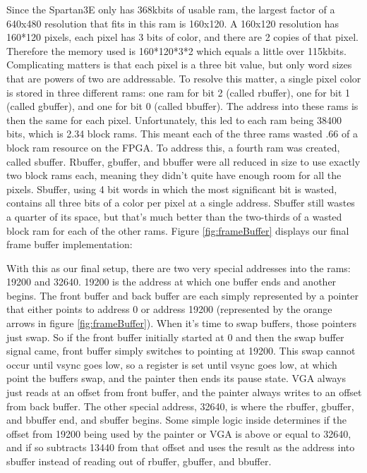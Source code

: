 \documentclass[onecolumn]{IEEEtran}
\begin{document}
Since the Spartan3E only has 368kbits of usable ram, the largest factor of a 640x480 resolution that fits in this ram is 160x120.  A 160x120 resolution has 160*120 pixels, each pixel has 3 bits of color, and there are 2 copies of that pixel.  Therefore the memory used is 160*120*3*2 which equals a little over 115kbits.  Complicating matters is that each pixel is a three bit value, but only word sizes that are powers of two are addressable.  To resolve this matter, a single pixel color is stored in three different rams: one ram for bit 2 (called rbuffer), one for bit 1 (called gbuffer), and one for bit 0 (called bbuffer).  The address into these rams is then the same for each pixel.  Unfortunately, this led to each ram being 38400 bits, which is 2.34 block rams.  This meant each of the three rams wasted .66 of a block ram resource on the FPGA.  To address this, a fourth ram was created, called sbuffer.  Rbuffer, gbuffer, and bbuffer were all reduced in size to use exactly two block rams each, meaning they didn’t quite have enough room for all the pixels.  Sbuffer, using 4 bit words in which the most significant bit is wasted, contains all three bits of a color per pixel at a single address.  Sbuffer still wastes a quarter of its space, but that’s much better than the two-thirds of a wasted block ram for each of the other rams.  Figure \ref{fig:frameBuffer} displays our final frame buffer implementation:


With this as our final setup, there are two very special addresses into the rams: 19200 and 32640.  19200 is the address at which one buffer ends and another begins.  The front buffer and back buffer are each simply represented by a pointer that either points to address 0 or address 19200 (represented by the orange arrows in figure \ref{fig:frameBuffer}).  When it’s time to swap buffers, those pointers just swap.  So if the front buffer initially started at 0 and then the swap buffer signal came, front buffer simply switches to pointing at 19200.  This swap cannot occur until vsync goes low, so a register is set until vsync goes low, at which point the buffers swap, and the painter then ends its pause state.  VGA always just reads at an offset from front buffer, and the painter always writes to an offset from back buffer.  The other special address, 32640, is where the rbuffer, gbuffer, and bbuffer end, and sbuffer begins.  Some simple logic inside determines if the offset from 19200 being used by the painter or VGA is above or equal to 32640, and if so subtracts 13440 from that offset and uses the result as the address into sbuffer instead of reading out of rbuffer, gbuffer, and bbuffer.
\end{document}
